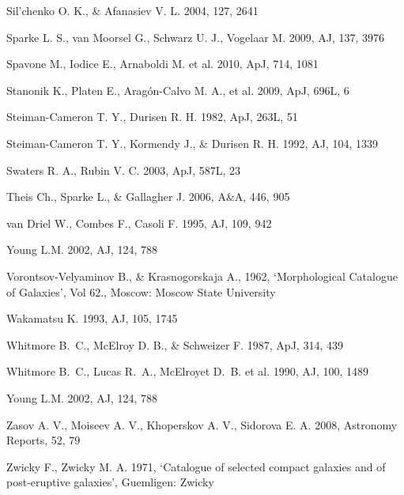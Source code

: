 \documentclass[useAMS,usenatbib]{mn2e}
\begin{document}
\begin{thebibliography}{}
Sil'chenko  O. K., \& Afanasiev V. L. 2004, 127, 2641

Sparke L. S., van Moorsel  G.,  Schwarz U. J.,  Vogelaar M.  2009, AJ, 137, 3976


Spavone M.,  Iodice E., Arnaboldi M. et al. 2010, ApJ, 714, 1081



Stanonik K., Platen E., Arag\'{o}n-Calvo M. A.,  et al. 2009, ApJ, 696L, 6

Steiman-Cameron  T. Y., Durisen R. H. 1982, ApJ, 263L, 51

Steiman-Cameron  T. Y., Kormendy J., \& Durisen R. H. 1992, AJ, 104, 1339

Swaters  R. A., Rubin V. C. 2003, ApJ, 587L, 23


Theis Ch.,  Sparke L., \& Gallagher J. 2006, A\&A, 446, 905

van Driel W., Combes F.,  Casoli F. 1995, AJ, 109, 942

Young L.M. 2002, AJ, 124, 788

Vorontsov-Velyaminov B., \&  Krasnogorskaja A., 1962,
`Morphological Catalogue of Galaxies', Vol 62., Moscow: Moscow
State University

Wakamatsu K. 1993, AJ, 105, 1745

Whitmore B.~C., McElroy  D. B., \& Schweizer  F. 1987, ApJ, 314, 439

Whitmore B.~C., Lucas  R.~A., McElroyet D.~B. et al. 1990, AJ, 100, 1489

Young L.M. 2002, AJ, 124, 788

Zasov A. V., Moiseev A. V., Khoperskov A. V., Sidorova E. A. 2008, Astronomy Reports, 52, 79

Zwicky F., Zwicky M. A. 1971, `Catalogue of selected compact
galaxies and of post-eruptive galaxies', Guemligen: Zwicky


\end{thebibliography}
\end{document}
